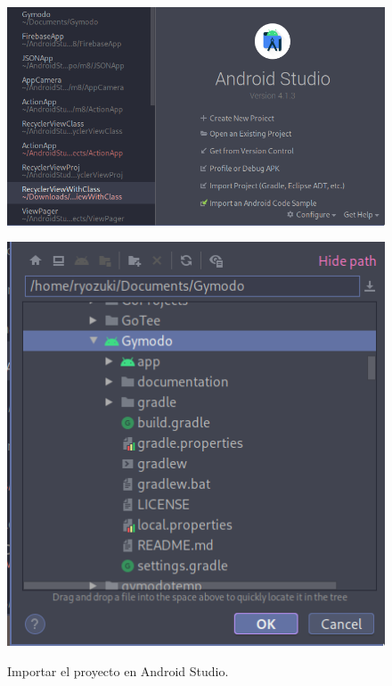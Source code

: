 \documentclass[12pt,a4paper]{article}
\begin{document}
\begin{figure}[htb]
    \begin{minipage}[t]{.55\textwidth}
        \centering
        \includegraphics[width=\textwidth]{android-studio-menu1}
        \label{fig:androidmenu}
    \end{minipage}
    \hfill
    \begin{minipage}[t]{.35\textwidth}
        \centering
        \includegraphics[width=\textwidth]{android-studio-menu2}
        \label{fig:androidmenu2}
    \end{minipage}  
    \label{fig:androidimport}
    \caption{Importar el proyecto en Android Studio.}
\end{figure}
\end{document}

